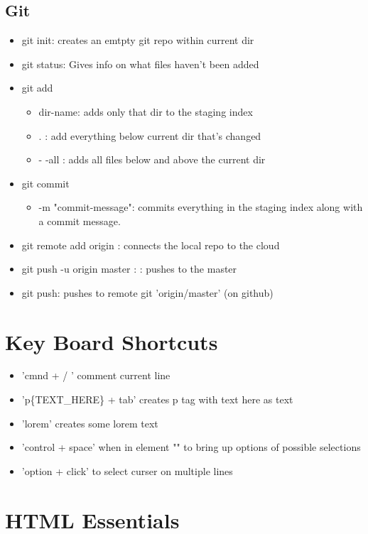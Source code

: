\documentclass[]{article}
\newcommand{\<}{\guilsinglleft}
\renewcommand{\>}{\guilsinglright}
\begin{document}
\subsection{Git}
\begin{itemize}
	\item git init: creates an emtpty git repo within current dir
	\item git status: Gives info on what files haven't been added
	\item git add 
	\begin{itemize}
		\item dir-name: adds only that dir to the staging index
		\item . : add everything below current dir that's changed
		\item  - -all : adds all files below and above the current dir 
	\end{itemize}
	\item git commit 
	\begin{itemize}
		\item -m "commit-message": commits everything in the staging index along with a commit message.
	\end{itemize}
	\item git remote add origin : connects the local repo to the cloud 
	\item git push -u origin master : : pushes to the master 
	\item git push: pushes to remote git 'origin/master' (on github)
\end{itemize}

\section{Key Board Shortcuts}
	\begin{itemize}
		\item 'cmnd + / ' comment current line 
		\item 'p\{TEXT\_HERE\} + tab' creates p tag with text here as text 
		\item 'lorem' creates some lorem text
		\item 'control + space' when in element "" to bring up options of possible selections
		\item 'option + click' to select curser on multiple lines
	\end{itemize}

\section{HTML Essentials}
\end{document}
